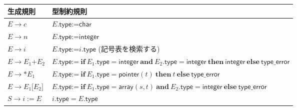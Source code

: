 \documentclass[dvipdfmx]{jarticle}
\newcommand{\ttcol}{\texttt{:}}
\newcommand{\tteq}{\texttt{=}}
\newcommand{\ttasgn}{\ttcol\tteq}
\newcommand{\ttpl}{\texttt{+}}
\newcommand{\ttbrkl}{\texttt{[}}
\newcommand{\ttbrkr}{\texttt{]}}
\begin{document}
\begin{tabular}{|l|l|}\hline
生成規則 & 型制約規則\\\hline
$E\rightarrow c$ & $E.\mathsf{type}\ttasgn\mathsf{char}$\\
$E\rightarrow n$ & $E.\mathsf{type}\ttasgn\mathsf{integer}$\\
$E\rightarrow i$ & $E.\mathsf{type}\ttasgn i.\mathsf{type}$ (記号表を検索する)\\
$E\rightarrow E_1\ttpl E_2$ & $E.\mathsf{type}\ttasgn\ \mathbf{if}\ 
E_1.\mathsf{type}=\mathsf{integer}\ \mathbf{and}\ E_2.\mathsf{type}=\mathsf{integer}
\ \mathbf{then}\ \mathsf{integer}\ \mathbf{else}\ \mathsf{type\_error}$\\
$E\rightarrow \texttt{*}E_1$ & $E.\mathsf{type}\ttasgn\ \mathbf{if}\ E_1.\mathsf{type}=\mathsf{pointer}(t)
\ \mathbf{then}\ t\ \mathbf{else}\ \mathsf{type\_error}$\\
$E\rightarrow E_1\ttbrkl E_2\ttbrkr$ & $E.\mathsf{type}\ttasgn\
\mathbf{if}\ E_1.\mathsf{type}=\mathsf{array}(s,t)\ \mathbf{and}\ E_2.\mathsf{type}=\mathsf{integer}
\ \mathbf{else}\ \mathsf{type\_error}$\\
$S\rightarrow i\mathtt{:=} E$ & $i.\mathsf{type}\!=E.\mathsf{type}$\\\hline
\end{tabular}
\end{document}
